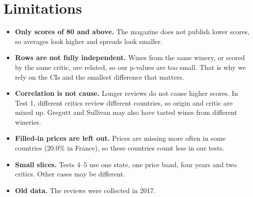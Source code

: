 \documentclass[10pt,a4paper,twocolumn]{article}
\newif\ifshowhints
\newcommand{\hint}[1]{\ifshowhints\par{\color{gray}\itshape\small #1\par}\fi}
\begin{document}
\section{Limitations}
\hint{What your analysis cannot show, and why: rows you dropped, assumptions that hold only approximately, groups your
conclusions do not cover, and association versus cause.}
\begin{itemize}
\item \textbf{Only scores of 80 and above.} The magazine does not publish lower scores, so averages look higher and
spreads look smaller.
\item \textbf{Rows are not fully independent.} Wines from the same winery, or scored by the same critic, are related,
so our p-values are too small. That is why we rely on the CIs and the smallest difference that matters.
\item \textbf{Correlation is not cause.} Longer reviews do not cause higher scores. In Test 1, different critics review
different countries, so origin and critic are mixed up. Gregutt and Sullivan may also have tasted wines from different
wineries.
\item \textbf{Filled-in prices are left out.} Prices are missing more often in some countries (20.0\% in France), so
these countries count less in our tests.
\item \textbf{Small slices.} Tests 4--5 use one state, one price band, four years and two critics. Other cases may be
different.
\item \textbf{Old data.} The reviews were collected in 2017.
\end{itemize}
\end{document}
